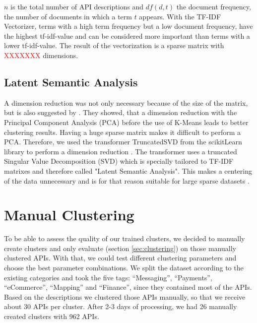 \documentclass[a4paper]{IEEEtran}
\begin{document}
$n$ is the total number of API descriptions and $df(d,t)$ the document frequency, the number of documents in which a term $t$ appears. 
With the TF-IDF Vectorizer, terms with a high term frequency but a low document frequency, have the highest tf-idf-value and can be considered more important than terms with a lower tf-idf-value. The result of the vectorization is a sparse matrix with \textcolor{red} {XXXXXXX} dimensions.

\subsection{Latent Semantic Analysis}
A dimension reduction was not only necessary because of the size of the matrix, but is also suggested by \cite{ding2004k}. They showed, that a dimension reduction with the Principal Component Analysis (PCA) before the use of K-Means leads to better clustering  results. Having a huge sparse matrix makes it difficult to perform a PCA. Therefore, we used the transformer TruncatedSVD from the scikitLearn library to perform a dimension reduction \cite{scikit-learn}. The transformer uses a truncated Singular Value Decomposition (SVD) which is specially tailored to TF-IDF matrixes and therefore called "Latent Semantic Analysis". This makes a centering of the data unnecessary and is for that reason suitable for large sparse datasets \cite{albright2004taming}.

\section{Manual Clustering}
To be able to assess the quality of our trained clusters, we decided to manually create clusters and only evaluate (section \ref{sec:clustering}) on those manually clustered APIs. With that, we could test different clustering parameters and choose the best parameter combinations. We split the dataset according to the existing categories and took the five tags: “Messaging”, “Payments”, “eCommerce”, “Mapping” and “Finance”, since they contained most of the APIs. Based on the descriptions we clustered those APIs manually, so that we receive about 30 APIs per cluster. After 2-3 days of processing, we had 26 manually created clusters with 962 APIs.
\end{document}
